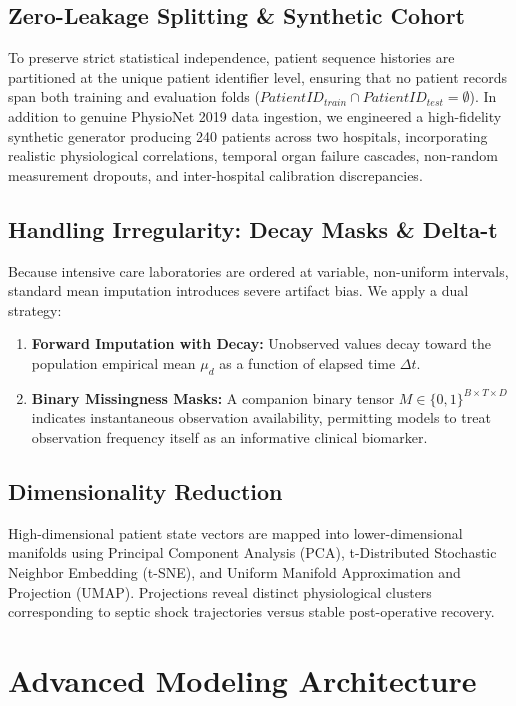 \documentclass[conference]{IEEEtran}
\begin{document}
\subsection{Zero-Leakage Splitting \& Synthetic Cohort}
To preserve strict statistical independence, patient sequence histories are partitioned at the unique patient identifier level, ensuring that no patient records span both training and evaluation folds ($PatientID_{train} \cap PatientID_{test} = \emptyset$). In addition to genuine PhysioNet 2019 data ingestion, we engineered a high-fidelity synthetic generator producing 240 patients across two hospitals, incorporating realistic physiological correlations, temporal organ failure cascades, non-random measurement dropouts, and inter-hospital calibration discrepancies.

\subsection{Handling Irregularity: Decay Masks \& Delta-t}
Because intensive care laboratories are ordered at variable, non-uniform intervals, standard mean imputation introduces severe artifact bias. We apply a dual strategy:
\begin{enumerate}
    \item \textbf{Forward Imputation with Decay:} Unobserved values decay toward the population empirical mean $\mu_d$ as a function of elapsed time $\Delta t$.
    \item \textbf{Binary Missingness Masks:} A companion binary tensor $M \in \{0, 1\}^{B \times T \times D}$ indicates instantaneous observation availability, permitting models to treat observation frequency itself as an informative clinical biomarker.
\end{enumerate}

\subsection{Dimensionality Reduction}
High-dimensional patient state vectors are mapped into lower-dimensional manifolds using Principal Component Analysis (PCA), t-Distributed Stochastic Neighbor Embedding (t-SNE), and Uniform Manifold Approximation and Projection (UMAP). Projections reveal distinct physiological clusters corresponding to septic shock trajectories versus stable post-operative recovery.

\section{Advanced Modeling Architecture}
\end{document}
